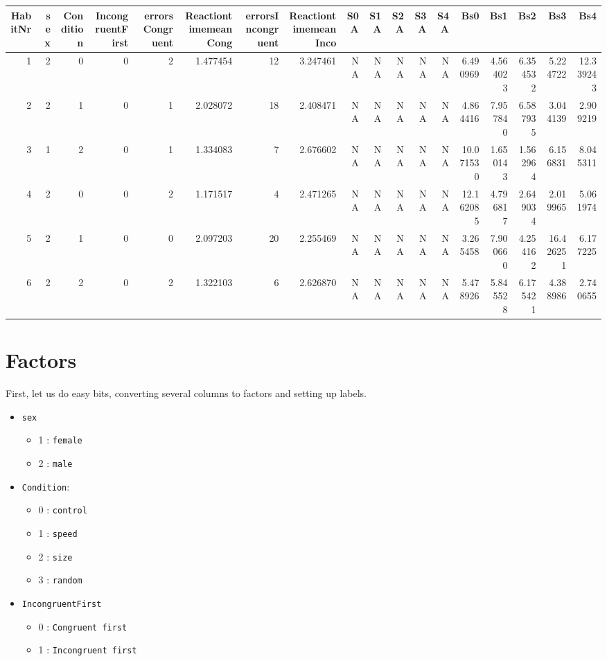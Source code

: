 \documentclass[
]{book}
\providecommand{\tightlist}{%
  \setlength{\itemsep}{0pt}\setlength{\parskip}{0pt}}
\begin{document}
\begin{tabular}{r|r|r|r|r|r|r|r|r|r|r|r|r|r|r|r|r|r}
\hline
HabitNr & sex & Condition & IncongruentFirst & errorsCongruent & ReactiontimemeanCong & errorsIncongruent & ReactiontimemeanInco & S0A & S1A & S2A & S3A & S4A & Bs0 & Bs1 & Bs2 & Bs3 & Bs4\\
\hline
1 & 2 & 0 & 0 & 2 & 1.477454 & 12 & 3.247461 & NA & NA & NA & NA & NA & 6.490969 & 4.564023 & 6.354532 & 5.224722 & 12.339243\\
\hline
2 & 2 & 1 & 0 & 1 & 2.028072 & 18 & 2.408471 & NA & NA & NA & NA & NA & 4.864416 & 7.957840 & 6.587935 & 3.044139 & 2.909219\\
\hline
3 & 1 & 2 & 0 & 1 & 1.334083 & 7 & 2.676602 & NA & NA & NA & NA & NA & 10.071530 & 1.650143 & 1.562964 & 6.156831 & 8.045311\\
\hline
4 & 2 & 0 & 0 & 2 & 1.171517 & 4 & 2.471265 & NA & NA & NA & NA & NA & 12.162085 & 4.796817 & 2.649034 & 2.019965 & 5.061974\\
\hline
5 & 2 & 1 & 0 & 0 & 2.097203 & 20 & 2.255469 & NA & NA & NA & NA & NA & 3.265458 & 7.900660 & 4.254162 & 16.426251 & 6.177225\\
\hline
6 & 2 & 2 & 0 & 2 & 1.322103 & 6 & 2.626870 & NA & NA & NA & NA & NA & 5.478926 & 5.845528 & 6.175421 & 4.388986 & 2.740655\\
\hline
\end{tabular}

\hypertarget{factors-1}{%
\section{Factors}\label{factors-1}}

First, let us do easy bits, converting several columns to factors and setting up labels.

\begin{itemize}
\tightlist
\item
  \texttt{sex}

  \begin{itemize}
  \tightlist
  \item
    1 : \texttt{female}
  \item
    2 : \texttt{male}
  \end{itemize}
\item
  \texttt{Condition}:

  \begin{itemize}
  \tightlist
  \item
    0 : \texttt{control}
  \item
    1 : \texttt{speed}
  \item
    2 : \texttt{size}
  \item
    3 : \texttt{random}
  \end{itemize}
\item
  \texttt{IncongruentFirst}

  \begin{itemize}
  \tightlist
  \item
    0 : \texttt{Congruent\ first}
  \item
    1 : \texttt{Incongruent\ first}
  \end{itemize}
\end{itemize}
\end{document}
